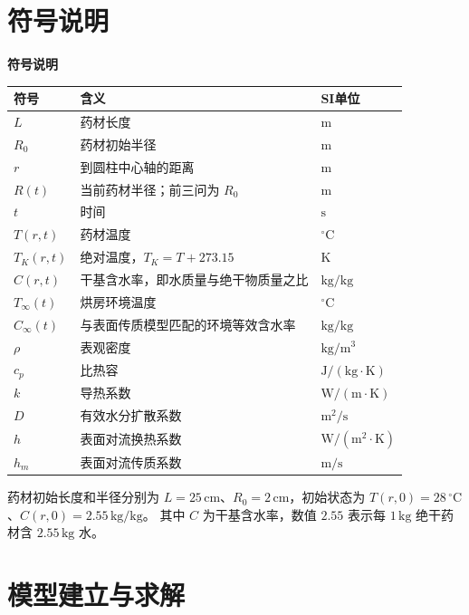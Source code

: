 \documentclass[withoutpreface,bwprint]{cumcmthesis}
\begin{document}
\section{符号说明}
{\centering\textbf{符号说明}\par}
\begin{table}[H]
\centering
\renewcommand{\arraystretch}{1.12}
\begin{tabularx}{0.96\textwidth}{>{\centering\arraybackslash}p{}X>{\centering\arraybackslash}p{}}
\toprule
符号 & 含义 & SI单位 \\
\midrule
$L$ & 药材长度 & $\mathrm{m}$ \\
$R_0$ & 药材初始半径 & $\mathrm{m}$ \\
$r$ & 到圆柱中心轴的距离 & $\mathrm{m}$ \\
$R(t)$ & 当前药材半径；前三问为 $R_0$ & $\mathrm{m}$ \\
$t$ & 时间 & $\mathrm{s}$ \\
$T(r,t)$ & 药材温度 & $^\circ\mathrm{C}$ \\
$T_K(r,t)$ & 绝对温度，$T_K=T+273.15$ & $\mathrm{K}$ \\
$C(r,t)$ & 干基含水率，即水质量与绝干物质量之比 & $\mathrm{kg/kg}$ \\
$T_\infty(t)$ & 烘房环境温度 & $^\circ\mathrm{C}$ \\
$C_\infty(t)$ & 与表面传质模型匹配的环境等效含水率 & $\mathrm{kg/kg}$ \\
$\rho$ & 表观密度 & $\mathrm{kg/m^3}$ \\
$c_p$ & 比热容 & $\mathrm{J/(kg\cdot K)}$ \\
$k$ & 导热系数 & $\mathrm{W/(m\cdot K)}$ \\
$D$ & 有效水分扩散系数 & $\mathrm{m^2/s}$ \\
$h$ & 表面对流换热系数 & $\mathrm{W/(m^2\cdot K)}$ \\
$h_m$ & 表面对流传质系数 & $\mathrm{m/s}$ \\
\bottomrule
\end{tabularx}
\end{table}

药材初始长度和半径分别为 $L=25\,\mathrm{cm}$、$R_0=2\,\mathrm{cm}$，初始状态为 $T(r,0)=28\,{}^\circ\mathrm{C}$、$C(r,0)=2.55\,\mathrm{kg/kg}$。
其中 $C$ 为干基含水率，数值 $2.55$ 表示每 $1\,\mathrm{kg}$ 绝干药材含 $2.55\,\mathrm{kg}$ 水。


\section{模型建立与求解}
\end{document}
